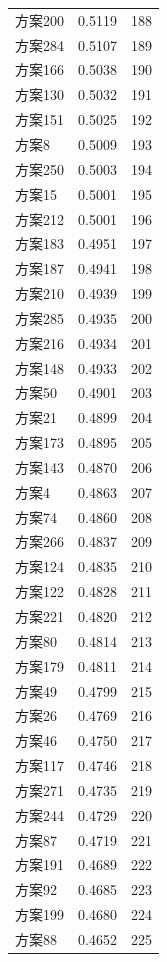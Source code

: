 \documentclass[12pt,a4paper]{article}
\begin{document}
\begin{table}[H]
\begin{tabular}{lcc}
    方案200 & 0.5119 & 188 \\
    方案284 & 0.5107 & 189 \\
    方案166 & 0.5038 & 190 \\
    方案130 & 0.5032 & 191 \\
    方案151 & 0.5025 & 192 \\
    方案8 & 0.5009 & 193 \\
    方案250 & 0.5003 & 194 \\
    方案15 & 0.5001 & 195 \\
    方案212 & 0.5001 & 196 \\
    方案183 & 0.4951 & 197 \\
    方案187 & 0.4941 & 198 \\
    方案210 & 0.4939 & 199 \\
    方案285 & 0.4935 & 200 \\
    方案216 & 0.4934 & 201 \\
    方案148 & 0.4933 & 202 \\
    方案50 & 0.4901 & 203 \\
    方案21 & 0.4899 & 204 \\
    方案173 & 0.4895 & 205 \\
    方案143 & 0.4870 & 206 \\
    方案4 & 0.4863 & 207 \\
    方案74 & 0.4860 & 208 \\
    方案266 & 0.4837 & 209 \\
    方案124 & 0.4835 & 210 \\
    方案122 & 0.4828 & 211 \\
    方案221 & 0.4820 & 212 \\
    方案80 & 0.4814 & 213 \\
    方案179 & 0.4811 & 214 \\
    方案49 & 0.4799 & 215 \\
    方案26 & 0.4769 & 216 \\
    方案46 & 0.4750 & 217 \\
    方案117 & 0.4746 & 218 \\
    方案271 & 0.4735 & 219 \\
    方案244 & 0.4729 & 220 \\
    方案87 & 0.4719 & 221 \\
    方案191 & 0.4689 & 222 \\
    方案92 & 0.4685 & 223 \\
    方案199 & 0.4680 & 224 \\
    方案88 & 0.4652 & 225 \\

\end{tabular}
\end{table}
\end{document}
